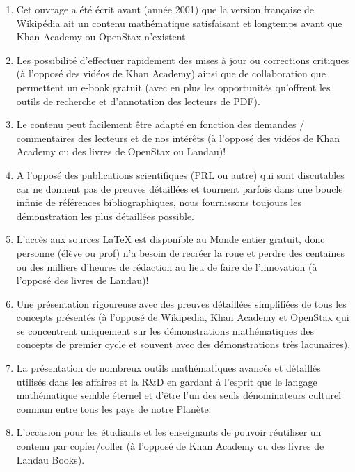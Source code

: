 \begin{enumerate}
		\item Cet ouvrage a \'et\'e \'ecrit avant (ann\'ee 2001) que la version française de Wikip\'edia ait un contenu math\'ematique satisfaisant et longtemps avant que Khan Academy ou OpenStax n'existent.

		\item Les possibilit\'e d'effectuer rapidement des mises à jour ou corrections critiques  (à l'oppos\'e des vid\'eos de Khan Academy) ainsi que de  collaboration que permettent un e-book gratuit (avec en plus les opportunit\'es qu'offrent les outils de recherche et d'annotation des lecteurs de PDF).

		\item Le contenu peut facilement être adapt\'e en fonction des demandes / commentaires des lecteurs et de nos int\'erêts (à l'oppos\'e des vid\'eos de Khan Academy ou des livres de OpenStax ou Landau)!
		
		\item A l'oppos\'e des publications scientifiques (PRL ou autre) qui sont discutables car ne donnent pas de preuves d\'etaill\'ees et tournent parfois dans une boucle infinie de r\'ef\'erences bibliographiques, nous fournissons toujours les d\'emonstration les plus d\'etaill\'ees possible.
		
		\item L'accès aux sources \LaTeX{} est disponible au Monde entier gratuit, donc personne (\'elève ou prof) n'a besoin de recr\'eer la roue et perdre des centaines ou des milliers d'heures de r\'edaction au lieu de faire de l'innovation (à l'oppos\'e des livres de Landau)!

		\item Une pr\'esentation rigoureuse avec des preuves d\'etaill\'ees simplifi\'ees de tous les concepts pr\'esent\'es (à l'oppos\'e de Wikipedia, Khan Academy et OpenStax qui se concentrent uniquement sur les d\'emonstrations math\'ematiques des concepts de premier cycle et souvent avec des d\'emonstrations très lacunaires).

		\item La pr\'esentation de nombreux outils math\'ematiques avanc\'es et d\'etaill\'es utilis\'es dans les affaires et la R\&D en gardant à l'esprit que le langage math\'ematique semble \'eternel et d'être l'un des seuls d\'enominateurs culturel commun entre tous les pays de notre Planète.

		\item L'occasion pour les \'etudiants et les enseignants de pouvoir r\'eutiliser un contenu par copier/coller (à l'oppos\'e de Khan Academy ou des livres de Landau Books).


\end{enumerate}
